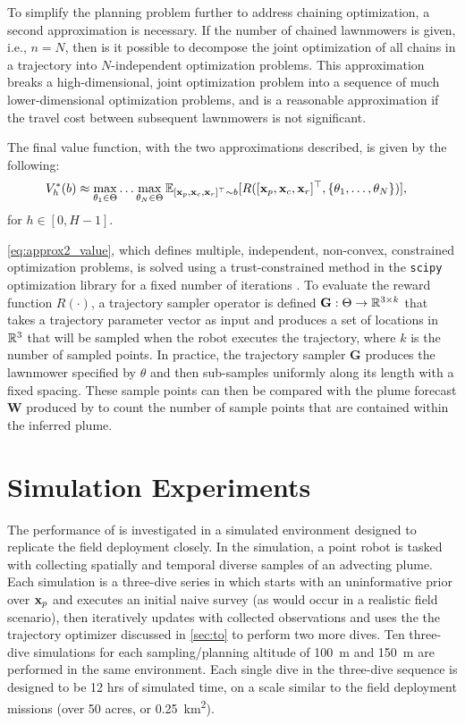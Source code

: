 To simplify the planning problem further to address chaining optimization, a second approximation is necessary. If the number of chained lawnmowers is given, i.e., $n=N$, then is it possible to decompose the joint optimization of all chains in a trajectory into $N$-independent optimization problems. This approximation breaks a high-dimensional, joint optimization problem into a sequence of much lower-dimensional optimization problems, and is a reasonable approximation if the travel cost between subsequent lawnmowers is not significant. 

The final \PHORTEX value function, with the two approximations described, is given by the following:
\begin{align}
     V_h^{*}(b) &\approx  \max_{\theta_1 \in \Theta} \dots \max_{\theta_N\in \Theta} \mathbb{E}_{[\mathbf{x}_{p}, \mathbf{x}_{c}, \mathbf{x}_{r}]^\top \sim b}[R([\mathbf{x}_{p}, \mathbf{x}_{c}, \mathbf{x}_{r}]^\top, \{\theta_1, \dots, \theta_N\})],
    \label{eq:approx2_value}
\end{align}
\noindent for $h \in [0, H-1]$.

\cref{eq:approx2_value}, which defines multiple, independent, non-convex, constrained optimization problems, is solved using a trust-constrained method in the \texttt{scipy} optimization library for a fixed number of iterations \autocite{conn2000trust}. To evaluate the reward function $R(\cdot)$, a trajectory sampler operator is defined $\mathbf{G}: \Theta \to \mathbb{R}^{3 \times k}$ that takes a trajectory parameter vector as input and produces a set of locations in $\mathbb{R}^3$ that will be sampled when the robot executes the trajectory, where $k$ is the number of sampled points. In practice, the trajectory sampler $\mathbf{G}$ produces the lawnmower specified by $\theta$ and then sub-samples uniformly along its length with a fixed spacing. These sample points can then be compared with the plume forecast $\mathbf{W}$ produced by \PHUMES to count the number of sample points that are contained within the inferred plume.


\section{Simulation Experiments}
\label{sec:experiments}
The performance of \PHORTEX is investigated in a simulated environment designed to replicate the field deployment closely. In the simulation, a point robot is tasked with collecting spatially and temporal diverse samples of an advecting plume. Each simulation is a three-dive series in which \PHORTEX starts with an uninformative prior over $\mathbf{x}_p$ and executes an initial naive survey (as would occur in a realistic field scenario), then iteratively updates \PHUMES with collected observations and uses the the trajectory optimizer discussed in \cref{sec:to} to perform two more dives. Ten three-dive simulations for each sampling/planning altitude of \SI{100}{\meter} and \SI{150}{\meter} are performed in the same environment. Each single dive in the three-dive sequence is designed to be 12 hrs of simulated time, on a scale similar to the field deployment missions (over 50 acres, or \SI{0.25}{\kilo\meter\squared}). 

